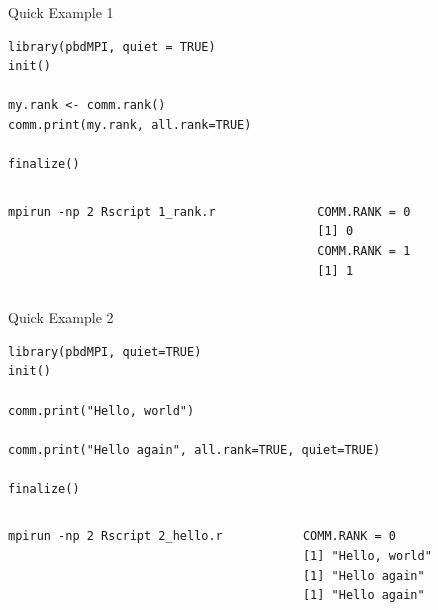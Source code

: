 \begin{frame}[fragile]
  \begin{exampleblock}{Quick Example 1}
  \centering
\begin{lstlisting}[title=Rank Query: 1\_rank.r]
library(pbdMPI, quiet = TRUE)
init()

my.rank <- comm.rank()
comm.print(my.rank, all.rank=TRUE)

finalize()
\end{lstlisting}
  \begin{columns}[t,onlytextwidth]
    \begin{column}{0.62\textwidth}
\begin{lstlisting}[backgroundcolor=\color{white},keywordstyle=\color{black},title=Execute this script via:]
mpirun -np 2 Rscript 1_rank.r
\end{lstlisting}    
    \end{column}
    \hfill
    \begin{column}{0.35\textwidth}
\begin{lstlisting}[title=Sample Output:]
COMM.RANK = 0
[1] 0
COMM.RANK = 1
[1] 1
\end{lstlisting}
    \end{column}
​  \end{columns}
  \end{exampleblock}
\end{frame}



\begin{frame}[fragile]
  \begin{exampleblock}{Quick Example 2}
\begin{lstlisting}[title=Hello World: 2\_hello.r]
library(pbdMPI, quiet=TRUE)
init()

comm.print("Hello, world")

comm.print("Hello again", all.rank=TRUE, quiet=TRUE)

finalize()
\end{lstlisting}
  \begin{columns}[t,onlytextwidth]
    \begin{column}{0.58\textwidth}
\begin{lstlisting}[backgroundcolor=\color{white},keywordstyle=\color{black},title=Execute this script via:]
mpirun -np 2 Rscript 2_hello.r
\end{lstlisting}    
    \end{column}
    \hfill
    \begin{column}{0.4\textwidth}
\begin{lstlisting}[title=Sample Output:]
COMM.RANK = 0
[1] "Hello, world"
[1] "Hello again"
[1] "Hello again"
\end{lstlisting}
    \end{column}
​  \end{columns}
  \end{exampleblock}
\end{frame}



